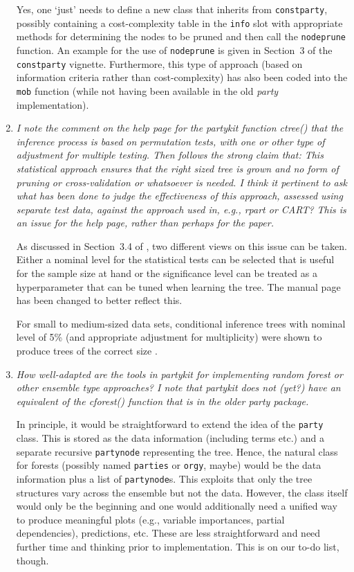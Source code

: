 \documentclass{article}
\begin{document}
\begin{enumerate}
Yes, one `just' needs to define a new class that inherits from \texttt{constparty},
possibly containing a cost-complexity table in the \texttt{info} slot with
appropriate methods for determining the nodes to be pruned and then call
the \texttt{nodeprune} function. An example for the use of \texttt{nodeprune} is
given in Section~3 of the \texttt{constparty} vignette. Furthermore,
this type of approach (based on information criteria rather than cost-complexity)
has also been coded into the \texttt{mob} function (while not having been available
in the old \emph{party} implementation).

\item 
\textit{%
I note the comment on the help page for the partykit function ctree() that
the inference process is based on permutation tests, with one or other type
of adjustment for multiple testing.  Then follows the strong claim that:
This statistical approach ensures that the right sized tree is grown and no
form of pruning or cross-validation or whatsoever is needed.  I think it
pertinent to ask what has been done to judge the effectiveness of this
approach, assessed using separate test data, against the approach used in,
e.g., rpart or CART?  This is an issue for the help page, rather than
perhaps for the paper.
}

\smallskip
As discussed in Section~3.4 of \cite{Hothorn+Hornik+Zeileis:2006}, two
different views on this issue can be taken. Either a nominal level for
the statistical tests can be selected that is useful for the sample size
at hand or the significance level can be treated as a hyperparameter that
can be tuned when learning the tree. The manual page has been changed
to better reflect this.

For small to medium-sized data sets, conditional inference trees with
nominal level of 5\% (and appropriate adjustment for multiplicity) were
shown to produce trees of the correct size \citep[simulation results
in][]{Hothorn+Hornik+Zeileis:2006}.

\item 
\textit{%
How well-adapted are the tools in partykit for implementing random forest
or other ensemble type approaches? I note that partykit does not (yet?) have
an equivalent of the cforest() function that is in the older party package.
}

\smallskip

In principle, it would be straightforward to extend the idea of the \texttt{party}
class. This is stored as the data information (including terms etc.) and a separate recursive
\texttt{partynode} representing the tree. Hence, the natural class for forests
(possibly named \texttt{parties} or \texttt{orgy}, maybe) would be the data
information plus a list of \texttt{partynode}s. This exploits that only the tree
structures vary across the ensemble but not the data. However, the class itself
would only be the beginning and one would additionally need a unified way to produce
meaningful plots (e.g., variable importances, partial dependencies), predictions,
etc. These are less straightforward and need further time and thinking prior
to implementation. This is on our to-do list, though.

\end{enumerate}
\end{document}
